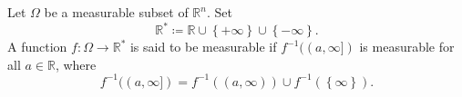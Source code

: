 \begin{definition}
    Let \(\Omega \) be a measurable subset of \(\mathbb{R} ^n\). Set 
    \[
        \mathbb{R} ^* \coloneqq \mathbb{R} \cup \left\{ +\infty \right\} \cup \left\{ -\infty \right\}.  
    \]  
    A function \(f: \Omega \to \mathbb{R} ^*\) is said to be measurable if \(f^{-1} ((a, \infty])\) is measurable for all \(a \in \mathbb{R}\), where
    \[
        f^{-1}((a, \infty]) = f^{-1}((a, \infty )) \cup f^{-1}(\left\{ \infty \right\} ).
    \]    
\end{definition}
